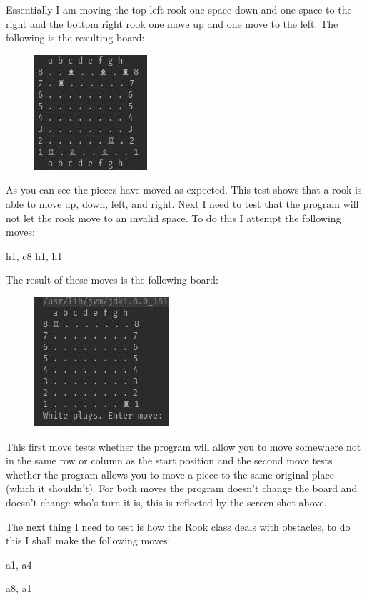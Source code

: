 \documentclass[a4paper]{article}
\begin{document}
Essentially I am moving the top left rook one space down and one space to the right and the bottom right rook one move up and one move to the left. The following is the resulting board:
\begin{figure}[H]
\centering
\includegraphics[scale=2.5]{rookBasicMovement}
\end{figure}
As you can see the pieces have moved as expected. This test shows that a rook is able to move up, down, left, and right. Next I need to test that the program will not let the rook move to an invalid space. To do this I attempt the following moves:

\noindent h1, c8
\noindent h1, h1

The result of these moves is the following board:
\begin{figure}[h]
\centering
\includegraphics[scale=2.5]{screenshot1}
\end{figure}

This first move tests whether the program will allow you to move somewhere not in the same row or column as the start position and the second move tests whether the program allows you to move a piece to the same original place (which it shouldn't). For both moves the program doesn't change the board and doesn't change who's turn it is, this is reflected by the screen shot above.

The next thing I need to test is how the Rook class deals with obstacles, to do this I shall make the following moves:

\noindent a1, a4

\noindent a8, a1
\end{document}
